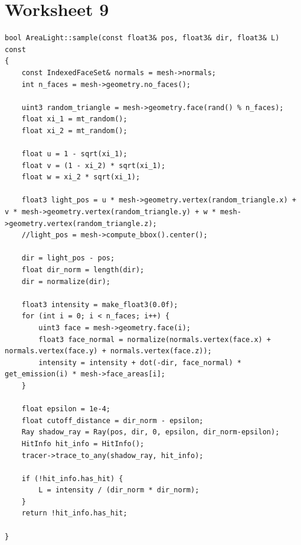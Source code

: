 \section{Worksheet 9}
\begin{lstlisting}
bool AreaLight::sample(const float3& pos, float3& dir, float3& L) const
{	
	const IndexedFaceSet& normals = mesh->normals;
	int n_faces = mesh->geometry.no_faces();
	
	uint3 random_triangle = mesh->geometry.face(rand() % n_faces);
	float xi_1 = mt_random();
	float xi_2 = mt_random();
	
	float u = 1 - sqrt(xi_1);
	float v = (1 - xi_2) * sqrt(xi_1);
	float w = xi_2 * sqrt(xi_1);
	
	float3 light_pos = u * mesh->geometry.vertex(random_triangle.x) + v * mesh->geometry.vertex(random_triangle.y) + w * mesh->geometry.vertex(random_triangle.z);
	//light_pos = mesh->compute_bbox().center();
	
	dir = light_pos - pos;
	float dir_norm = length(dir);
	dir = normalize(dir);
	
	float3 intensity = make_float3(0.0f);
	for (int i = 0; i < n_faces; i++) {
		uint3 face = mesh->geometry.face(i);
		float3 face_normal = normalize(normals.vertex(face.x) + normals.vertex(face.y) + normals.vertex(face.z));
		intensity = intensity + dot(-dir, face_normal) * get_emission(i) * mesh->face_areas[i];
	}
	
	float epsilon = 1e-4;
	float cutoff_distance = dir_norm - epsilon;
	Ray shadow_ray = Ray(pos, dir, 0, epsilon, dir_norm-epsilon);
	HitInfo hit_info = HitInfo();
	tracer->trace_to_any(shadow_ray, hit_info);
	
	if (!hit_info.has_hit) {
		L = intensity / (dir_norm * dir_norm);
	}
	return !hit_info.has_hit;
	
}
\end{lstlisting}

